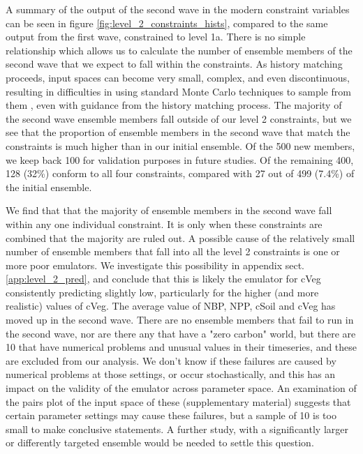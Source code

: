 \documentclass[gmd, manuscript]{copernicus}
\begin{document}
A summary of the output of the second wave in the modern constraint variables can be seen in figure \ref{fig:level_2_constraints_hists}, compared to the same output from the first wave, constrained to level 1a. There is no simple relationship which allows us to calculate the number of ensemble members of the second wave that we expect to fall within the constraints. As history matching proceeds, input spaces can become very small, complex, and even discontinuous, resulting in difficulties in using standard Monte Carlo techniques to sample from them \cite{williamson2013efficient}, even with guidance from the history matching process. The majority of the second wave ensemble members fall outside of our level 2 constraints, but we see that the proportion of ensemble members in the second wave that match the constraints is much higher than in our initial ensemble. Of the 500 new members, we keep back 100 for validation purposes in future studies. Of the remaining 400, 128 (32\%) conform to all four constraints, compared with 27 out of 499 (7.4\%) of the initial ensemble.

We find that that the majority of ensemble members in the second wave fall within any one individual constraint. It is only when these constraints are combined that the majority are ruled out. A possible cause of the relatively small number of ensemble members that fall into all the level 2 constraints is one or more poor emulators. We investigate this possibility in appendix sect. \ref{app:level_2_pred}, and conclude that this is likely the emulator for cVeg consistently predicting slightly low, particularly for the higher (and more realistic) values of cVeg. The average value of NBP, NPP, cSoil and cVeg has moved up in the second wave. There are no ensemble members that fail to run in the second wave, nor are there any that have a "zero carbon" world, but there are 10 that have numerical problems and unusual values in their timeseries, and these are excluded from our analysis. We don't know if these failures are caused by numerical problems at those settings, or occur stochastically, and this has an impact on the validity of the emulator across parameter space. An examination of the pairs plot of the input space of these (supplementary material) suggests that certain parameter settings may cause these failures, but a sample of 10 is too small to make conclusive statements. A further study, with a significantly larger or differently targeted ensemble would be needed to settle this question.
\end{document}
